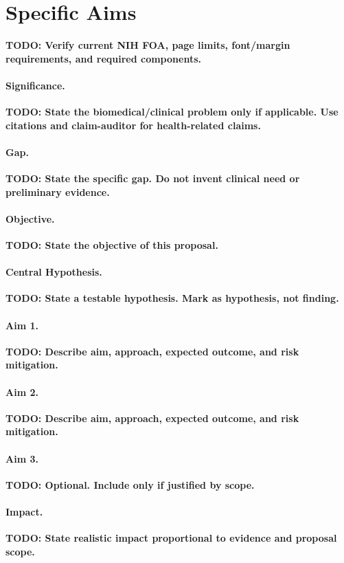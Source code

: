 \documentclass[11pt]{article}
\newcommand{\todo}[1]{\textbf{TODO: #1}}
\begin{document}
\section*{Specific Aims}

\todo{Verify current NIH FOA, page limits, font/margin requirements, and required components.}

\paragraph{Significance.}
\todo{State the biomedical/clinical problem only if applicable. Use citations and claim-auditor for health-related claims.}

\paragraph{Gap.}
\todo{State the specific gap. Do not invent clinical need or preliminary evidence.}

\paragraph{Objective.}
\todo{State the objective of this proposal.}

\paragraph{Central Hypothesis.}
\todo{State a testable hypothesis. Mark as hypothesis, not finding.}

\paragraph{Aim 1.}
\todo{Describe aim, approach, expected outcome, and risk mitigation.}

\paragraph{Aim 2.}
\todo{Describe aim, approach, expected outcome, and risk mitigation.}

\paragraph{Aim 3.}
\todo{Optional. Include only if justified by scope.}

\paragraph{Impact.}
\todo{State realistic impact proportional to evidence and proposal scope.}
\end{document}
